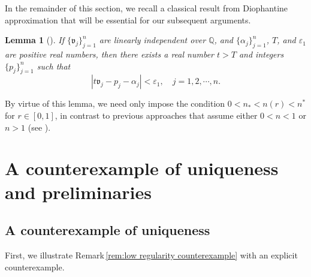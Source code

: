 \documentclass[11pt,reqno]{amsart}
\newtheorem{lemma}{Lemma}[section]
\theoremstyle{definition}
\theoremstyle{remark}
\numberwithin{equation}{section}
\begin{document}
In the remainder of this section, we recall a classical result from Diophantine approximation that will be essential for our subsequent arguments.
\begin{lemma}[{\cite{HW80}}]\label{lem:Kronecker_approximation}
	If $\{\mathfrak{v}_j\}_{j=1}^{n}$ are linearly independent over $\mathbb{Q}$, and $\{\alpha_j\}_{j=1}^{n}$, $T$, and $\varepsilon_1$ are positive real numbers, then there exists a real number $t > T$ and integers $\{p_j\}_{j=1}^{n}$ such that
	\begin{equation*}
		\left| t \mathfrak{v}_j - p_j - \alpha_j \right| < \varepsilon_1, \quad j = 1, 2, \cdots, n.
	\end{equation*}
\end{lemma}
By virtue of this lemma, we need only impose the condition $0 < n_* < n(r) < n^{*}$ for $r \in [0,1]$, in contrast to previous approaches that assume either $0 < n < 1$ or $n > 1$ (see \cite{CCH16,CL13}).


\section{A counterexample of uniqueness and preliminaries}\label{sec:A counterexample and preliminaries}


\subsection{A counterexample of uniqueness}\label{sec:counterexample}

First, we illustrate Remark\,\ref{rem:low regularity counterexample} with an explicit counterexample.
\end{document}

